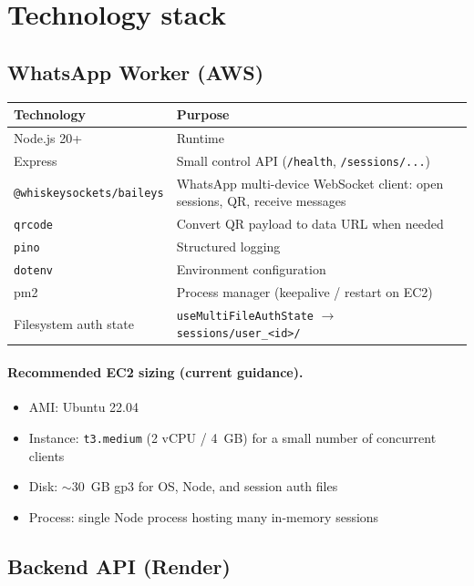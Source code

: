 \documentclass[11pt,a4paper]{article}
\begin{document}
\section{Technology stack}

\subsection{WhatsApp Worker (AWS)}

\begin{tabularx}{\textwidth}{L{5.2cm} X}
\toprule
\textbf{Technology} & \textbf{Purpose} \\
\midrule
Node.js 20+ & Runtime \\
Express & Small control API (\texttt{/health}, \texttt{/sessions/...}) \\
\texttt{@whiskeysockets/baileys} & WhatsApp multi-device WebSocket client: open sessions, QR, receive messages \\
\texttt{qrcode} & Convert QR payload to data URL when needed \\
\texttt{pino} & Structured logging \\
\texttt{dotenv} & Environment configuration \\
pm2 & Process manager (keepalive / restart on EC2) \\
Filesystem auth state & \texttt{useMultiFileAuthState} $\rightarrow$ \texttt{sessions/user\_<id>/} \\
\bottomrule
\end{tabularx}

\paragraph{Recommended EC2 sizing (current guidance).}
\begin{itemize}[leftmargin=1.2em]
  \item AMI: Ubuntu 22.04
  \item Instance: \texttt{t3.medium} (2 vCPU / 4~GB) for a small number of concurrent clients
  \item Disk: $\sim$30~GB gp3 for OS, Node, and session auth files
  \item Process: single Node process hosting many in-memory sessions
\end{itemize}

\subsection{Backend API (Render)}
\end{document}
